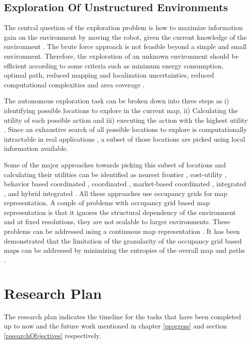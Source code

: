 \documentclass[12pt,a4paper]{report}
\begin{document}
\section{Exploration Of Unstructured Environments}
The central question of the exploration problem is how to maximize information gain on the environment by moving the robot, given the current knowledge of the environment \cite{yamauchi1997}. The brute force approach is not feasible beyond a simple and small environment. Therefore, the exploration of an unknown environment should be efficient according to some criteria such as minimum energy consumption, optimal path, reduced mapping and localization uncertainties, reduced computational complexities and area coverage \cite{jadidi2013exploration}.

The autonomous exploration task can be broken down into three steps as i) identifying possible locations to explore in the current map, ii) Calculating the utility of each possible action and iii) executing the action with the highest utility \cite{carrillo2015autonomous}. Since an exhaustive search of all possible locations to explore is computationally intractable in real applications \cite{carlone2014active}, a subset of those locations are picked using local information available. \par 

Some of the major approaches towards picking this subset of locations and calculating their utilities can be identified as nearest frontier \cite{yamauchi1998frontier}, cost-utility \cite{gonzalez2002navigation}, behavior based coordinated \cite{lau2003behavioural}, coordinated \cite{burgard2000collaborative},  market-based coordinated \cite{zlot2002multi}, integrated \cite{makarenko2002experiment}, and hybrid integrated \cite{julia2010hybrid}. All these approaches use occupancy grids for map representation. A couple of problems with occupancy grid based map representation is that it ignores the structural dependency of the environment and at fixed resolutions, they are not scalable to larger environments. These problems can be addressed using a continuous map representation \cite{jadidi2013exploration}. It has been demonstrated that the limitation of the granularity of the occupancy grid based maps can be addressed by minimizing the entropies of the overall map and paths \cite{valencia2012active}. \par

\chapter{Research Plan}
The research plan indicates the timeline for the tasks that have been completed up to now and the future work mentioned in chapter \ref{progress} and section \ref{researchObjectives} respectively.
\end{document}
